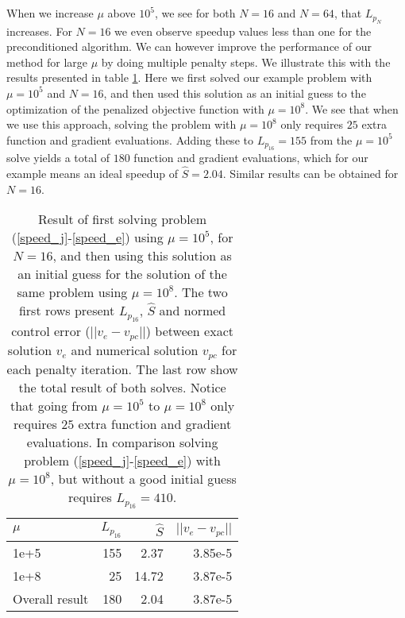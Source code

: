 \\
\\
When we increase $\mu$ above $10^5$, we see for both $N=16$ and $N=64$, that $L_{p_N}$ increases. For $N=16$ we even observe speedup values less than one for the preconditioned algorithm. We can however improve the performance of our method for large $\mu$ by doing multiple penalty steps. We illustrate this with the results presented in table \ref{mu4}. Here we first solved our example problem with $\mu=10^5$ and $N=16$, and then used this solution as an initial guess to the optimization of the penalized objective function with $\mu =10^8$. We see that when we use this approach, solving the problem with $\mu=10^8$ only requires $25$ extra function and gradient evaluations. Adding these to $L_{p_{16}}=155$ from the $\mu=10^5$ solve yields a total of $180$ function and gradient evaluations, which for our example means an ideal speedup of $\hat S =2.04$. Similar results can be obtained for $N=16$.
\\
\begin{table}[h!]
\caption{Result of first solving problem (\ref{speed_j}-\ref{speed_e}) using $\mu=10^5$, for $N=16$, and then using this solution as an initial guess for the solution of the same problem using $\mu=10^8$. The two first rows present $L_{p_{16}}$, $\hat S$ and normed control error ($||v_e-v_{pc}||$) between exact solution $v_e$ and numerical solution $v_{pc}$ for each penalty iteration. The last row show the total result of both solves. Notice that going from $\mu=10^5$ to $\mu=10^8$ only requires $25$ extra function and gradient evaluations. In comparison solving problem (\ref{speed_j}-\ref{speed_e}) with $\mu=10^8$, but without a good initial guess requires $L_{p_{16}}=410$. } \label{mu4}
\begin{tabular}{lrrr}
\toprule
{} $\mu$ & $L_{p_{16}}$ & $\hat S$ & $||v_e-v_{pc}||$ \\
\midrule
1e+5 &155 &2.37 &3.85e-5\\
1e+8 &25 &14.72 &3.87e-5\\
\midrule
Overall result &180 &2.04 &3.87e-5\\
\bottomrule
\end{tabular}
\end{table}
